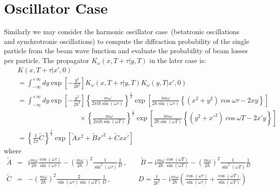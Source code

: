 \documentclass[]{article}
\begin{document}
\section{Oscillator Case}
Similarly we may consider the harmonic oscillator case~(betatronic 
oscillations and synchrotronic oscillations) to compute the diffraction 
probability of the single particle from the beam wave function and evaluate 
the probability of beam losses per particle. The propagator 
$K_{\omega} \left( x , T + \tau | y , T \right)$
in the later case is:
\begin{eqnarray}
& & K \left(x , T + \tau | x' , 0 \right) \nonumber \\
& & =
\int_{- \infty}^{+ \infty}  dy
\exp{ \left[- \frac{y^2}{2 b^2} \right]} 
K_{\omega} \left(x , T + \tau | y , T \right) 
K_{\omega} \left(y , T | x' , 0 \right)  \nonumber \\
& & =
\int_{- \infty}^{+ \infty}  dy
\exp{\left[- \frac{y^2}{2 b^2} \right]}
\left\{\frac{m \omega}{2 \pi \mathrm{i}\hbar \sin (\omega \tau)}\right\}^{\frac{1}{2}}
\exp \left[
\frac{\mathrm{i}m \omega}{2 \hbar \sin (\omega \tau)}
\left\{ \left(x^2 + y^2\right) \cos \omega \tau - 2 x y \right\}
\right] \nonumber \\
& & \qquad \qquad \qquad \qquad \quad \times
\left\{\frac{m \omega}{2 \pi \mathrm{i}\hbar \sin (\omega T)}\right\}^{\frac{1}{2}}
\exp \left[
\frac{\mathrm{i}m \omega}{2 \hbar \sin (\omega T)}
\left\{\left(y^2 + {x'}^2\right) \cos \omega T - 2 x' y \right\}
\right] \nonumber \\
& & =
\left\{\frac{1}{2 \pi} \tilde{C} \right\}^{\frac{1}{2}}
\exp
\left[\tilde{A} x^2 + \tilde{B} {x'}^2 + \tilde{C} x x' \right]
\label{betatron}
\end{eqnarray}
%
where
\begin{eqnarray}
\tilde{A} & = &
\mathrm{i}\frac{m \omega}{2 \hbar} 
\frac{\cos\left(\omega \tau\right)}{\sin\left(\omega \tau\right)}
-
\left(\frac{m \omega}{2 \hbar}\right)^2
\frac{1}{\sin^{2} \left(\omega \tau\right)}
\frac{1}{D}\,, \qquad
\tilde{B} =
\mathrm{i}\frac{m \omega}{2 \hbar} 
\frac{\cos\left(\omega T\right)}{\sin\left(\omega T\right)}
-
\left(\frac{m \omega}{2 \hbar}\right)^2
\frac{1}{\sin^{2} \left(\omega T\right)}
\frac{1}{D} \nonumber \\
\tilde{C} & = & 
-
\left(\frac{m \omega}{2 \hbar}\right)^2
\frac{2}{\sin\left(\omega \tau \right) \sin\left(\omega T\right)}
\frac{1}{D}\,, \quad \quad \qquad 
D =
\frac{1}{2 b^2} 
-
\mathrm{i}\frac{m \omega}{2 \hbar} 
\left(
\frac{\cos\left(\omega \tau\right)}{\sin\left(\omega \tau\right)}
+
\frac{\cos\left(\omega T\right)}{\sin\left(\omega T\right)}
\right)
\end{eqnarray}
\end{document}

